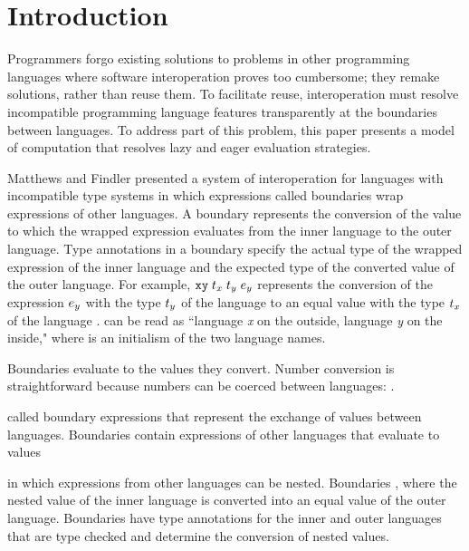 \section{Introduction}

Programmers forgo existing solutions to problems in other programming languages where software interoperation proves too cumbersome; they remake solutions, rather than reuse them. To facilitate reuse, interoperation must resolve incompatible programming language features transparently at the boundaries between languages. To address part of this problem, this paper presents a model of computation that resolves lazy and eager evaluation strategies.

Matthews and Findler presented \cite{matthews07} a system of interoperation for languages with incompatible type systems in which expressions called boundaries wrap expressions of other languages. A boundary represents the conversion of the value to which the wrapped expression evaluates from the inner language to the outer language. Type annotations in a boundary specify the actual type of the wrapped expression of the inner language and the expected type of the converted value of the outer language. For example, $\mathtt{xy}\;t_x\;t_y\;e_y$ represents the conversion of the expression $e_y$ with the type $t_y$ of the language  to an equal value with the type $t_x$ of the language .  can be read as ``language \emph{x} on the outside, language \emph{y} on the inside," where  is an initialism of the two language names.

Boundaries evaluate to the values they convert. Number conversion is straightforward because numbers can be coerced between languages: .


 called boundary expressions that represent the exchange of values between languages. Boundaries contain expressions of other languages that evaluate to values 

 in which expressions from other languages can be nested. Boundaries , where the nested value of the inner language is converted into an equal value of the outer language. Boundaries have type annotations for the inner and outer languages that are type checked and determine the conversion of nested values.



